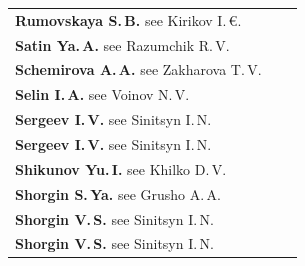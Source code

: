 {\begin{tabular}{p{311pt}rr}
\textbf{Rumovskaya S.\,B.} see Kirikov I.\,€.&&\\[-.3pt]


\textbf{Satin Ya.\,A.} see Razumchik R.\,V.&&\\[-.3pt]


\textbf{Schemirova A.\,A.} see Zakharova T.\,V.&&\\[-.3pt]


\textbf{Selin I.\,A.} see Voinov N.\,V.&&\\[-.3pt]


\textbf{Sergeev I.\,V.} see Sinitsyn I.\,N.&&\\[-.3pt]


\textbf{Sergeev I.\,V.} see Sinitsyn I.\,N.&&\\[-.3pt]


\textbf{Shikunov Yu.\,I.} see Khilko D.\,V.&&\\[-.3pt]


\textbf{Shorgin S.\,Ya.} see Grusho A.\,A.&&\\[-.3pt]


\textbf{Shorgin V.\,S.} see Sinitsyn I.\,N.&&\\[-.3pt]


\textbf{Shorgin V.\,S.} see Sinitsyn I.\,N.&&\\[-.3pt]


\end{tabular}


}





\pagebreak





\def\rightkol{2015 AUTHOR INDEX}


\def\leftkol{2015 AUTHOR INDEX}





\noindent


